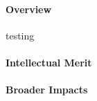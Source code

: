 
\paragraph{Overview} 
testing

\paragraph{Intellectual Merit}  

\paragraph{Broader Impacts}

\begin{comment}
 Prepare Project Summary (limited to one page) of Proposed Fellowship Activities, including both
research and training. Select GO next to Project Summary. This is an abstract of the proposed research
and training. You must clearly address and identify in separate statements using the three boxes: (1) an
overview of your proposed fellowship activities; (2) intellectual merit; and (3) broader impacts of the
activities. Without these 3 sections, your application will be returned without review. List your
sponsoring scientist(s) and institution(s) in the overview. Upload text in the proper boxes. Do not use
the Supplementary Document option for the summary. Do not use jargon and abbreviations in the
summary. It should be understandable by scientists not in your specialized field

\end{comment}